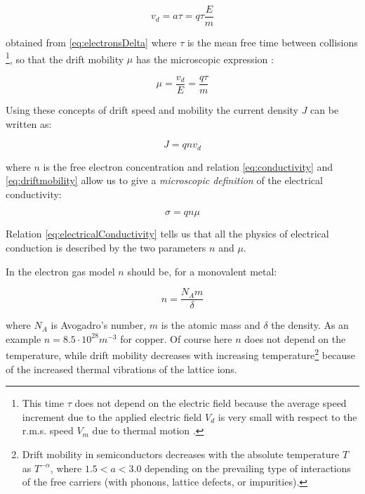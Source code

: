 \documentclass[]{book}
\let\rmarkdownfootnote\footnote%
\def\footnote{\protect\rmarkdownfootnote}
\begin{document}
\begin{equation}
v_d=a\tau=q\tau\frac{E}{m}
\label{eq:electronsAvgSpd}
\end{equation}

obtained from \eqref{eq:electronsDelta} where \(\tau\) is the mean free
time between collisions \footnote{This time \(\tau\) does not depend on
  the electric field because the average speed increment due to the
  applied electric field \(V_d\) is very small with respect to the
  r.m.s. speed \(V_m\) due to thermal motion .}, so that the drift
mobility \(\mu\) has the microscopic expression :

\begin{equation}
\mu = \frac{v_d}{E} = \frac{q\tau}{m}
\label{eq:driftmobility}
\end{equation}

Using these concepts of drift speed and mobility the current density
\(J\) can be written as:

\begin{equation}
J = qn v_d
\label{eq:currentDensity}
\end{equation}

where \(n\) is the free electron concentration and relation
\eqref{eq:conductivity} and \eqref{eq:driftmobility} allow us to give a
\emph{microscopic definition} of the electrical conductivity:

\begin{equation}
 \sigma = q n \mu 
\label{eq:electricalConductivity}
\end{equation}

Relation \eqref{eq:electricalConductivity} tells us that all the physics
of electrical conduction is described by the two parameters \(n\) and
\(\mu\).

In the electron gas model \(n\) should be, for a monovalent metal:

\begin{equation}
n=\frac{N_Am}{\delta}
\label{eq:nmonovalentmetal}
\end{equation}

where \(N_A\) is Avogadro's number, \(m\) is the atomic mass and
\(\delta\) the density. As an example \(n=8.5 \cdot 10^{28}m^{-3}\) for
copper. Of course here \(n\) does not depend on the temperature, while
drift mobility decreases with increasing temperature\footnote{Drift
  mobility in semiconductors decreases with the absolute temperature
  \(T\) as \(T^{-\alpha }\), where \(1.5<a<3.0\) depending on the
  prevailing type of interactions of the free carriers (with phonons,
  lattice defects, or impurities).} because of the increased thermal
vibrations of the lattice ions.
\end{document}

